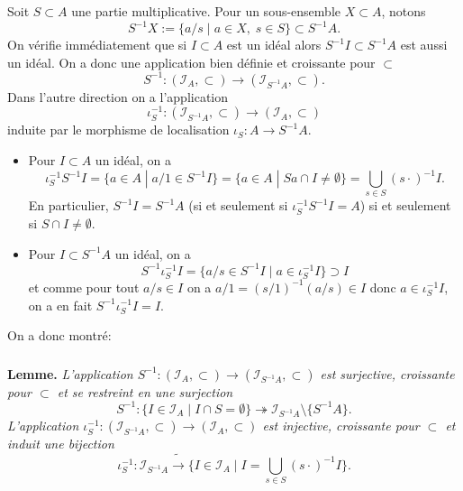 \documentclass[a4paper, 12pt]{amsart}
\begin{document}
\noindent Soit $S\subset A$ une partie multiplicative. Pour un sous-ensemble $X\subset A$, notons $$S^{-1}X:=\lbrace  a/s\;|\; a\in X,\; s\in S\rbrace \subset S^{-1}A. $$
On vérifie immédiatement que si $I\subset A$ est un idéal alors $S^{-1}I\subset S^{-1}A$ est aussi un idéal. On a donc une application bien définie et croissante pour $\subset$
$$S^{-1}:(\mathcal{I}_A,\subset)\rightarrow (\mathcal{I}_{S^{-1}A},\subset).$$
Dans l'autre direction on a l'application $$\iota_S^{-1}:(\mathcal{I}_{S^{-1}A},\subset)\rightarrow (\mathcal{I}_A,\subset)$$ induite  par le morphisme de localisation $\iota_S:A\rightarrow S^{-1}A$. 
\begin{itemize}[leftmargin=* ,parsep=0cm,itemsep=0cm,topsep=0cm] 
\item Pour $I\subset A$ un idéal, on a 
$$\iota_S^{-1}S^{-1}I=\lbrace a\in A\;|\; a/1\in S^{-1}I\rbrace= \lbrace a\in A\;|\;  Sa\cap I\not=\emptyset\rbrace=\bigcup_{s\in S}(s\cdot)^{-1}I.$$
En particulier, $S^{-1}I=S^{-1}A$ (si et seulement si $\iota_S^{-1}S^{-1}I=A$) si et seulement si $S\cap I\not=\emptyset$.\\
\item Pour $I\subset S^{-1}A$ un idéal, on a 
$$S^{-1}\iota_S^{-1}I=\lbrace a/s\in S^{-1}I\;|\; a\in \iota_S^{-1}I\rbrace\supset I$$
et comme  pour tout $a/s\in I$ on a $a/1= (s/1)^{-1}(a/s)\in I$ donc $a\in \iota_S^{-1}I$, on a en fait $S^{-1}\iota_S^{-1}I=I$.\\
 \end{itemize}
 
\noindent On a donc montré: 
 
\subsubsection{}\label{LocIdeaux}\textbf{Lemme.} \textit{L'application $S^{-1}:(\mathcal{I}_A,\subset)\rightarrow (\mathcal{I}_{S^{-1}A},\subset) $ est surjective, croissante pour $\subset$ et se restreint en une surjection    $$S^{-1}:\lbrace I\in\mathcal{I}_A\;|\; I\cap S=\emptyset\rbrace \twoheadrightarrow  \mathcal{I}_{S^{-1}A}\setminus \lbrace S^{-1}A\rbrace . $$
L'application $\iota_S^{-1}:(\mathcal{I}_{S^{-1}A},\subset) \rightarrow  (\mathcal{I}_A,\subset)$ est injective,  croissante pour $\subset$  et induit une bijection  
$$\iota_S^{-1}:\mathcal{I}_{S^{-1}A} \tilde{\rightarrow} \lbrace I\in\mathcal{I}_A\;|\; I=\bigcup_{s\in S}(s\cdot)^{-1}I\rbrace .$$}
\end{document}
